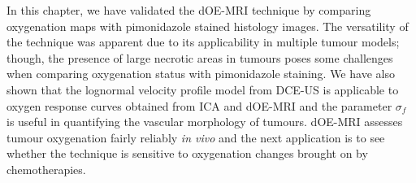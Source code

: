 In this chapter, we have validated the \ac{dOE-MRI} technique by comparing oxygenation maps with pimonidazole stained histology images. 
The versatility of the technique was apparent due to its applicability in multiple tumour models; though, the presence of large necrotic areas in tumours poses some challenges when comparing oxygenation status with pimonidazole staining.
We have also shown that the lognormal velocity profile model from \ac{DCE-US} is applicable to oxygen response curves obtained from \ac{ICA} and \ac{dOE-MRI} and the parameter $\sigma_f$ is useful in quantifying the vascular morphology of tumours.
\ac{dOE-MRI} assesses tumour oxygenation fairly reliably \emph{in vivo} and the next application is to see whether the technique is sensitive to oxygenation changes brought on by chemotherapies.

%

%

%